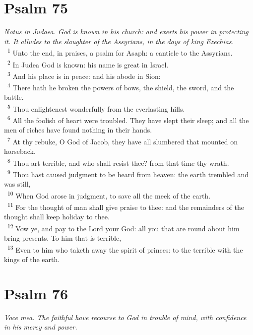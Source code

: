 \documentclass[a5paper,12pt]{article}
\begin{document}
\begin{multicols*}{2}
\section{Psalm 75}
\label{sec:org6b50ab6}
\emph{Notus in Judaea. God is known in his church: and exerts his power in protecting it. It alludes to the slaughter of the Assyrians, in the days of king Ezechias.}\\

~\textsuperscript{1} Unto the end, in praises, a psalm for Asaph: a canticle to the Assyrians.\\
~\textsuperscript{2} In Judea God is known: his name is great in Israel.\\
~\textsuperscript{3} And his place is in peace: and his abode in Sion:\\
~\textsuperscript{4} There hath he broken the powers of bows, the shield, the sword, and the battle.\\
~\textsuperscript{5} Thou enlightenest wonderfully from the everlasting hills.\\
~\textsuperscript{6} All the foolish of heart were troubled. They have slept their sleep; and all the men of riches have found nothing in their hands.\\
~\textsuperscript{7} At thy rebuke, O God of Jacob, they have all slumbered that mounted on horseback.\\
~\textsuperscript{8} Thou art terrible, and who shall resist thee? from that time thy wrath.\\
~\textsuperscript{9} Thou hast caused judgment to be heard from heaven: the earth trembled and was still,\\
~\textsuperscript{10} When God arose in judgment, to save all the meek of the earth.\\
~\textsuperscript{11} For the thought of man shall give praise to thee: and the remainders of the thought shall keep holiday to thee.\\
~\textsuperscript{12} Vow ye, and pay to the Lord your God: all you that are round about him bring presents. To him that is terrible,\\
~\textsuperscript{13} Even to him who taketh away the spirit of princes: to the terrible with the kings of the earth.\\

\section{Psalm 76}
\label{sec:org5345d84}
\emph{Voce mea. The faithful have recourse to God in trouble of mind, with confidence in his mercy and power.}\\


\end{multicols*}
\end{document}
